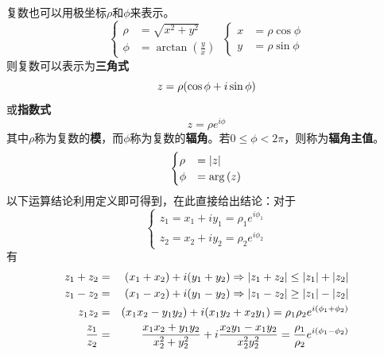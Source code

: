 \documentclass[12pt,a4paper,openany,twoside]{book}
\numberwithin{equation}{section}
\begin{document}
          复数也可以用极坐标$\rho$和$\phi$来表示。
          \begin{equation}
            \begin{cases}
              \rho&=\sqrt{x^2+y^2}\\
              \phi&=\arctan(\frac{y}{x})
            \end{cases}\ \begin{cases}
              x&=\rho\cos\phi\\
              y&=\rho\sin\phi
            \end{cases}
          \end{equation}
          则复数可以表示为\textbf{三角式}
          \begin{equation}
            z=\rho\qty(\cos\phi+i\sin\phi)
          \end{equation}
          或\textbf{指数式}
          \begin{equation}
            z=\rho e^{i\phi}
          \end{equation}
          其中$\rho$称为复数的\textbf{模}，而$\phi$称为复数的\textbf{辐角}。若$0\leq\phi<2\pi$，则称为\textbf{辐角主值}。
          \begin{equation}
            \begin{cases}
              \rho&=\abs{z}\\
              \phi&=\arg\qty(z)
            \end{cases}
          \end{equation}
          以下运算结论利用定义即可得到，在此直接给出结论：对于
          \begin{equation*}
            \begin{cases}
              z_1=x_1+iy_1=\rho_1 e^{i\phi_1}\\
              z_2=x_2+iy_2=\rho_2 e^{i\phi_2}
            \end{cases}
          \end{equation*}
          有
          \begin{eqnarray}
            z_1+z_2&=&\qty(x_1+x_2)+i\qty(y_1+y_2)\Rightarrow\abs{z_1+z_2}\leq\abs{z_1}+\abs{z_2}\\
            z_1-z_2&=&\qty(x_1-x_2)+i\qty(y_1-y_2)\Rightarrow\abs{z_1-z_2}\geq\abs{z_1}-\abs{z_2}\\
            z_1z_2&=&\qty(x_1x_2-y_1y_2)+i\qty(x_1y_2+x_2y_1)=\rho_1\rho_2 e^{i\qty(\phi_1+\phi_2)}\\
            \frac{z_1}{z_2}&=&\frac{x_1x_2+y_1y_2}{x_2^2+y_2^2}+i\frac{x_2y_1-x_1y_2}{x_2^2y_2^2}=\frac{\rho_1}{\rho_2}e^{i\qty(\phi_1-\phi_2)}
          \end{eqnarray}
\end{document}
